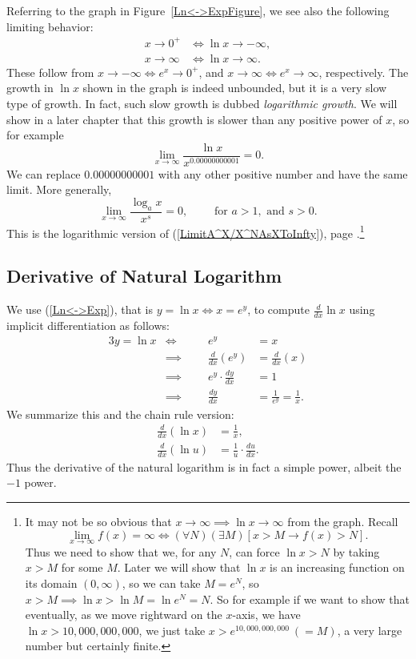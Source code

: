 Referring to the graph in Figure~\ref{Ln<->ExpFigure}, we see
also the following limiting behavior:
\begin{align}
x\to 0^+&\iff \ln x\to-\infty,\label{LnTo-Infty}\\
x\to\infty&\iff \ln x\to\infty.\label{LnToInfty}
\end{align}
These follow from $x\to-\infty\iff e^x\to0^+$,
and $x\to\infty\iff e^x\to\infty$, respectively.
The growth in $\ln x$ shown in the graph is indeed 
unbounded, but it is a very slow type of growth.
In fact, such slow growth is dubbed {\it logarithmic growth}.
We will show in a later chapter that this growth is slower
than any positive power of $x$, so for example
$$\lim_{x\to\infty}\frac{\ln x}{x^{0.00000000001}}=0.$$
We can replace $0.00000000001$ with any other positive
number and have the same limit.  More generally,
\begin{equation}\lim_{x\to\infty}\frac{\log_ax}{x^s}=0,
\qquad \text{ for } a>1,\text{ and } s>0.\label{LimitXToInftyLoga/X^s}
\end{equation}
This is the logarithmic version of 
(\ref{LimitA^X/X^NAsXToInfty}), page
\pageref{LimitA^X/X^NAsXToInfty}.\footnote{%
It may not be so obvious that $x\to\infty\implies\ln x\to\infty$
from the graph.  Recall
$$\lim_{x\to\infty}f(x)=\infty \iff
(\forall N)(\exists M)[x>M\longrightarrow f(x)>N].$$
Thus we need to show that we, for any $N$, can force $\ln x>N$ by 
taking $x>M$ for some $M$.  Later we will show that $\ln x$ is
an increasing function on its domain $(0,\infty)$, so 
we can take $M=e^N$, so $x>M\implies \ln x>\ln M=\ln e^N=N$.
So for example if we want to show that eventually, as we move rightward
on the $x$-axis, we have $\ln x>10,000,000,000$, we just 
take $x>e^{10,000,000,000}\ (=M)$, a very large number but certainly finite.
}

\subsection{Derivative of Natural Logarithm}
We use (\ref{Ln<->Exp}), that is $y=\ln x\iff x=e^y$, to compute
$\frac{d}{dx}\ln x$ using implicit differentiation as follows:
\begin{alignat*}{3}
y=\ln x&\iff\qquad&e^y&=x\\
       &\implies      &\frac{d}{dx}(e^y)&=\frac{d}{dx}(x)\\
       &\implies      &e^y\cdot\frac{dy}{dx}&=1\\
       &\implies      &\frac{dy}{dx}&=\frac1{e^y}=\frac1x.
\end{alignat*}
We summarize this and the chain rule version:
\begin{align}
    \frac{d}{dx}(\ln x)&=\frac1x,\label{DerivativeLnX}\\
    \frac{d}{dx}(\ln u)&=\frac1u\cdot\frac{du}{dx}.\label{DerivativeLnU}
\end{align}
Thus the derivative of the natural logarithm is in fact
a simple power, albeit the $-1$ power. 

